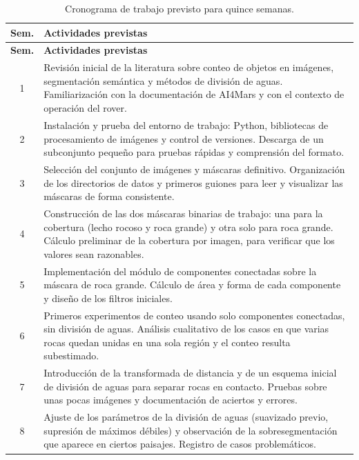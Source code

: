 \begin{longtable}{@{}cp{12.4cm}@{}}
  \caption{Cronograma de trabajo previsto para quince semanas.}
  \label{tab:cronograma}\\
  \toprule
  \textbf{Sem.} & \textbf{Actividades previstas} \\
  \midrule
  \endfirsthead
  \toprule
  \textbf{Sem.} & \textbf{Actividades previstas} \\
  \midrule
  \endhead
  \bottomrule
  \endfoot

  1 & Revisión inicial de la literatura sobre conteo de objetos en imágenes,
      segmentación semántica y métodos de división de aguas. Familiarización con la
      documentación de AI4Mars y con el contexto de operación del rover. \\
  2 & Instalación y prueba del entorno de trabajo: Python, bibliotecas de procesamiento de
      imágenes y control de versiones. Descarga de un subconjunto pequeño para pruebas
      rápidas y comprensión del formato. \\
  3 & Selección del conjunto de imágenes y máscaras definitivo. Organización de los
      directorios de datos y primeros guiones para leer y visualizar las máscaras de forma
      consistente. \\
  4 & Construcción de las dos máscaras binarias de trabajo: una para la cobertura (lecho
      rocoso y roca grande) y otra solo para roca grande. Cálculo preliminar de la
      cobertura por imagen, para verificar que los valores sean razonables. \\
  5 & Implementación del módulo de componentes conectadas sobre la máscara de roca grande.
      Cálculo de área y forma de cada componente y diseño de los filtros iniciales. \\
  6 & Primeros experimentos de conteo usando solo componentes conectadas, sin división de
      aguas. Análisis cualitativo de los casos en que varias rocas quedan unidas en una
      sola región y el conteo resulta subestimado. \\
  7 & Introducción de la transformada de distancia y de un esquema inicial de división de
      aguas para separar rocas en contacto. Pruebas sobre unas pocas imágenes y
      documentación de aciertos y errores. \\
  8 & Ajuste de los parámetros de la división de aguas (suavizado previo, supresión de
      máximos débiles) y observación de la sobresegmentación que aparece en ciertos
      paisajes. Registro de casos problemáticos. \\

\end{longtable}
